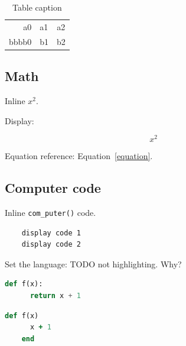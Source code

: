   \begin{table}
    \caption{Table caption}
    \label{table}
    \begin{tabular}{rlc}
      \hline
      a0    & a1 & a2 \\
      bbbb0 & b1 & b2 \\
      \hline
    \end{tabular}
  \end{table}

\subsection{Math}

  Inline \(x^2\).

  Display:

  \begin{equation}
    \label{equation}
    x^2
  \end{equation}

  Equation reference: Equation~\ref{equation}.

\subsection{Computer code}

  Inline \lstinline|com_puter()| code.

  \begin{lstlisting}
    display code 1
    display code 2
  \end{lstlisting}

  Set the language: TODO not highlighting. Why?

  \begin{lstlisting}[language=Python]
    def f(x):
      return x + 1
  \end{lstlisting}

  \begin{lstlisting}[language=Ruby]
    def f(x)
      x + 1
    end
  \end{lstlisting}
